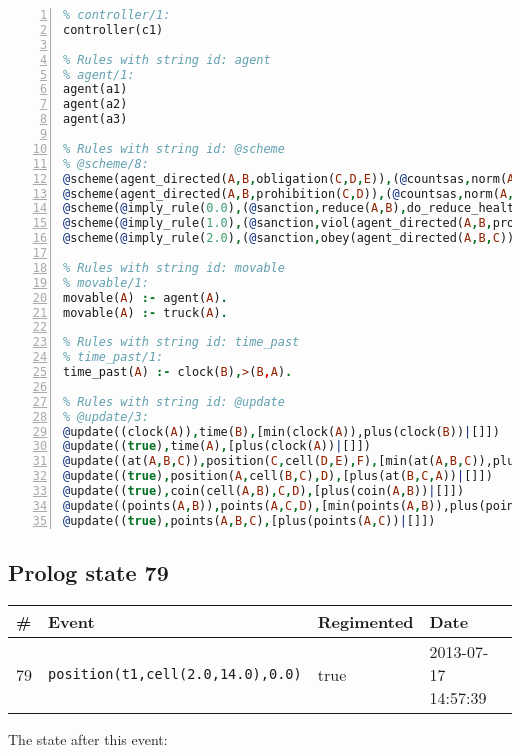 \documentclass[11pt]{article}\usepackage[utf8]{inputenc}\usepackage{geometry}
\begin{document}
\begin{lstlisting}[language=Prolog, numbers=left]
% Rules with string id: controller
% controller/1:
controller(c1)

% Rules with string id: agent
% agent/1:
agent(a1)
agent(a2)
agent(a3)

% Rules with string id: @scheme
% @scheme/8:
@scheme(agent_directed(A,B,obligation(C,D,E)),(@countsas,norm(A,B,F,obligation(C,D,E)),F),false,(listTrue(C)),(time_past(D)),false,[plus(viol(agent_directed(A,B,obligation(C,D,E))))|[]],[plus(obey(agent_directed(A,B,obligation(C,D,E))))|[]])
@scheme(agent_directed(A,B,prohibition(C,D)),(@countsas,norm(A,B,E,prohibition(C,D)),E),(listTrue(C)),false,(false),false,[plus(viol(agent_directed(A,B,prohibition(C,D))))|[]],[plus(obey(agent_directed(A,B,prohibition(C,D))))|[]])
@scheme(@imply_rule(0.0),(@sanction,reduce(A,B),do_reduce_health(A,B),notifyAgent(A,changed(status))),true,false,false,false,[min(reduce(A,B))|[]],[])
@scheme(@imply_rule(1.0),(@sanction,viol(agent_directed(A,B,prohibition(C,D))),do_sanction(D)),true,false,false,false,[min(viol(agent_directed(A,B,prohibition(C,D))))|[]],[])
@scheme(@imply_rule(2.0),(@sanction,obey(agent_directed(A,B,C))),true,false,false,false,[min(obey(agent_directed(A,B,C)))|[]],[])

% Rules with string id: movable
% movable/1:
movable(A) :- agent(A).
movable(A) :- truck(A).

% Rules with string id: time_past
% time_past/1:
time_past(A) :- clock(B),>(B,A).

% Rules with string id: @update
% @update/3:
@update((clock(A)),time(B),[min(clock(A)),plus(clock(B))|[]])
@update((true),time(A),[plus(clock(A))|[]])
@update((at(A,B,C)),position(C,cell(D,E),F),[min(at(A,B,C)),plus(at(D,E,C))|[]])
@update((true),position(A,cell(B,C),D),[plus(at(B,C,A))|[]])
@update((true),coin(cell(A,B),C,D),[plus(coin(A,B))|[]])
@update((points(A,B)),points(A,C,D),[min(points(A,B)),plus(points(A,D))|[]])
@update((true),points(A,B,C),[plus(points(A,C))|[]])

\end{lstlisting}
\clearpage 
\subsection{Prolog state 79}
\begin{table}[ht]
\centering 
\begin{tabular}{l l l l} 
\textbf{\#} & \textbf{Event} & \textbf{Regimented} & \textbf{Date} \\ [0.5ex] 
\hline
79&\texttt{position(t1,cell(2.0,14.0),0.0)}&true&2013-07-17 14:57:39\\ [1ex] \hline\end{tabular}
\end{table}
The state after this event:
\end{document}
